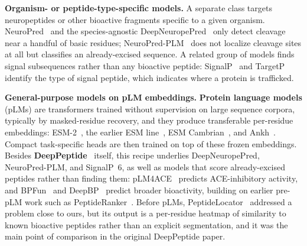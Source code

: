 \documentclass{article}
\begin{document}
\textbf{Organism- or peptide-type-specific models.} A separate class targets neuropeptides or other bioactive fragments specific to a given organism. NeuroPred~\citep{southey2006neuropred} and the species-agnostic DeepNeuropePred~\citep{wang2024deepneuropepred} only detect cleavage near a handful of basic residues; NeuroPred-PLM~\citep{wang2023neuropredplm} does not localize cleavage sites at all but classifies an already-excised sequence. A related group of models finds signal subsequences rather than any bioactive peptide: SignalP~\citep{teufel2022signalp6} and TargetP~\citep{almagro2019targetp} identify the type of signal peptide, which indicates where a protein is trafficked.

\textbf{General-purpose models on pLM embeddings.} \textbf{Protein language models} (pLMs) are transformers trained without supervision on large sequence corpora, typically by masked-residue recovery, and they produce transferable per-residue embeddings: ESM-2~\citep{lin2023esm2}, the earlier ESM line~\citep{esm2_2019}, ESM Cambrian~\citep{esm_cambrian_blog_2024,ESM-family}, and Ankh~\citep{ankh2023}. Compact task-specific heads are then trained on top of these frozen embeddings. Besides \textbf{DeepPeptide}~\citep{deeppeptide2023} itself, this recipe underlies DeepNeuropePred, NeuroPred-PLM, and SignalP~6, as well as models that score already-excised peptides rather than finding them: pLM4ACE~\citep{du2024plm4ace} predicts ACE-inhibitory activity, and BPFun~\citep{bpfun2025} and DeepBP~\citep{zhang2024deepbp} predict broader bioactivity, building on earlier pre-pLM work such as PeptideRanker~\citep{mooney2012peptideranker}. Before pLMs, PeptideLocator~\citep{mooney2013peptidelocator} addressed a problem close to ours, but its output is a per-residue heatmap of similarity to known bioactive peptides rather than an explicit segmentation, and it was the main point of comparison in the original DeepPeptide paper.
\end{document}
